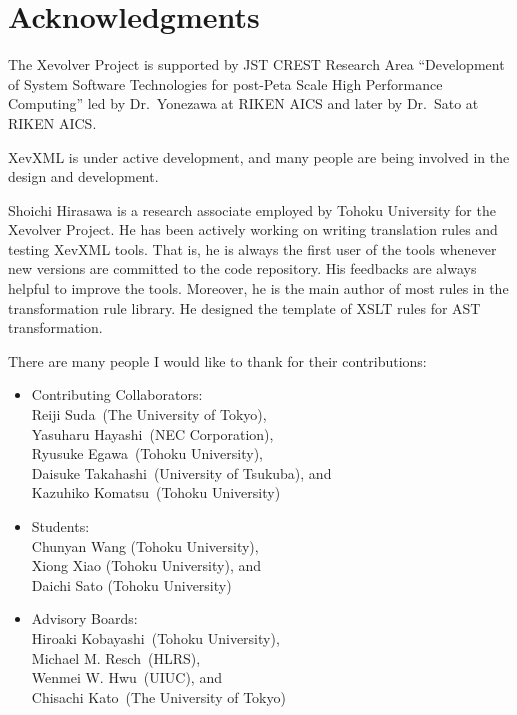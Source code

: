 \chapter*{Acknowledgments}

The Xevolver Project is supported by JST CREST Research Area
``Development of System Software Technologies for post-Peta Scale High
Performance Computing'' led by Dr.~Yonezawa at RIKEN AICS and later by
Dr.~Sato at RIKEN AICS.

XevXML is under active development, and many people are being involved
in the design and development.

Shoichi Hirasawa is a research associate employed by Tohoku University
for the Xevolver Project.  He has been actively working on writing
translation rules and testing XevXML tools. That is, he is always the
first user of the tools whenever new versions are committed to the code
repository.  His feedbacks are always helpful to improve the
tools. Moreover, he is the main author of most rules in the
transformation rule library. He designed the template of XSLT rules for
AST transformation.

There are many people I would like to thank for their contributions:
\begin{itemize}
 \item Contributing Collaborators: \\
       Reiji Suda~(The University of Tokyo),\\
       Yasuharu Hayashi~(NEC Corporation),\\
       Ryusuke Egawa~(Tohoku University),\\
       Daisuke Takahashi~(University of Tsukuba), and \\
       Kazuhiko Komatsu~(Tohoku University)

 \item Students: \\
       Chunyan Wang (Tohoku University),\\
       Xiong Xiao (Tohoku University), and \\
       Daichi Sato (Tohoku University)

 \item Advisory Boards:\\
       Hiroaki Kobayashi~(Tohoku University),\\
       Michael M. Resch~(HLRS),\\
       Wenmei W. Hwu~(UIUC), and\\
       Chisachi Kato~(The University of Tokyo)
\end{itemize}

